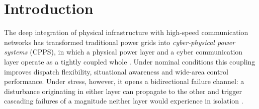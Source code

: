
\providecommand{\nodelay}{\texttt{no\_delay}}

\section{Introduction}\label{sec:intro}

The deep integration of physical infrastructure with high-speed
communication networks has transformed traditional power grids into
\emph{cyber-physical power systems} (CPPS), in which a physical power
layer and a cyber communication layer operate as a tightly coupled
whole \citep{Rinaldi2001,Ouyang2014}.  Under nominal conditions this
coupling improves dispatch flexibility, situational awareness and
wide-area control performance.  Under stress, however, it opens a
bidirectional failure channel: a disturbance originating in either
layer can propagate to the other and trigger cascading failures of a
magnitude neither layer would experience in isolation
\citep{Buldyrev2010,Gao2012}.

